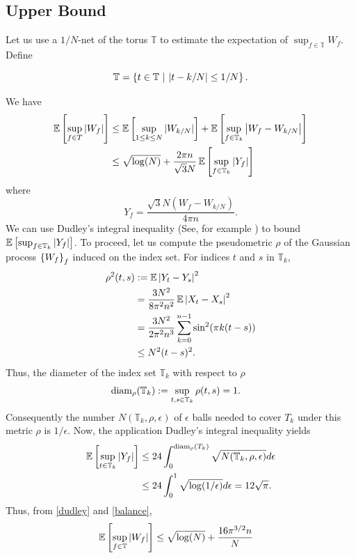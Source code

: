 \subsection{Upper Bound}

Let us use a $1/N$-net of the torus $\mathbb{T}$ to estimate the expectation of
$\sup_{f \in \mathbb{T}} {W_f}$. Define

\begin{equation*}
\mathbb{T} = \left\{t \in \mathbb{T} ~ \middle| ~ \left|t-k/N\right| \leq 1/N \right\}.
\end{equation*}

We have
\begin{align}
\nonumber\operatorname{\mathbb{E}}\left[\sup_{f \in T} |W_f| \right] & \leq \operatorname{\mathbb{E}}\left[\sup_{1 \leq k \leq N} |W_{k/N}| \right] + \operatorname{\mathbb{E}}\left[\sup_{f \in \mathbb{T}_k} \left|W_{f} - W_{k/N}\right| \right]\\
& \leq \sqrt{\log(N)} + \frac{2 \pi n}{\sqrt{3}N} \operatorname{\mathbb{E}}\left[\sup_{f \in \mathbb{T}_k} |Y_f| \right]\label{balance}
\end{align}
where 
\begin{equation}
Y_f = \frac{\sqrt{3} N  \left(W_f - W_{k/N}\right)}{4 \pi n}.
\end{equation}
We can use Dudley's integral inequality (See, for example
\cite{ledoux2011probability}) to bound $\operatorname{\mathbb{E}}\left[\sup_{f \in \mathbb{T}_k} |Y_f|
\right]$. To proceed, let us compute the pseudometric $\rho$ of the Gaussian
process $\left\{ W_f \right\}_f$ induced on the index set. For indices $t$ and $s$ in
$\mathbb{T}_k$,
\begin{align*}
\rho^2(t,s) & := \operatorname{\mathbb{E}} \left|Y_t - Y_s\right|^2\\
& = \frac{3 N^2}{8 \pi^2 n^2} \operatorname{\mathbb{E}} \left|X_t - X_s\right|^2\\
& = \frac{3 N^2}{2 \pi^2 n^3} \sum_{k=0}^{n-1}{\sin^2(\pi k (t - s))}\\
& \leq N^2 (t-s)^2.
\end{align*}
Thus, the diameter of the index set $\mathbb{T}_k$ with respect to $\rho$
\begin{align*}
\operatorname{diam}_\rho(\mathbb{T}_k) &:= \sup_{t,s  \in \mathbb{T}_k}\rho(t,s) = 1.
\end{align*}
Consequently the number $N(\mathbb{T}_k, \rho, \epsilon)$ of $\epsilon$ balls needed to cover $T_k$ under this metric $\rho$ is $1/\epsilon$. Now,  the application Dudley's integral inequality yields
\begin{align}
\operatorname{\mathbb{E}}\left[\sup_{t \in \mathbb{T}_k} |Y_f| \right] & \leq 24 \int_0^{\operatorname{diam}_\rho(T_k)} \sqrt{N(\mathbb{T}_k, \rho, \epsilon)} d\epsilon\\
 & \leq 24 \int_0^1 \sqrt{\log(1/\epsilon)} d\epsilon = 12 \sqrt{\pi}. \label{dudley}
\end{align}
Thus, from \eqref{dudley} and \eqref{balance}, 
\begin{align*}
\operatorname{\mathbb{E}}\left[\sup_{f \in \mathbb{T}} |W_f| \right] & \leq  \sqrt{\log(N)} +  \frac{ 16 \pi^{3/2} n} { N}
\end{align*}

